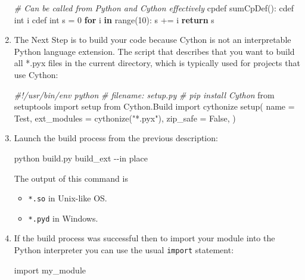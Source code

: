 \documentclass[
]{article}
\newenvironment{Shaded}{}{}
\newcommand{\AttributeTok}[1]{\textcolor[rgb]{0.49,0.56,0.16}{#1}}
\newcommand{\BuiltInTok}[1]{#1}
\newcommand{\CommentTok}[1]{\textcolor[rgb]{0.38,0.63,0.69}{\textit{#1}}}
\newcommand{\ControlFlowTok}[1]{\textcolor[rgb]{0.00,0.44,0.13}{\textbf{#1}}}
\newcommand{\DecValTok}[1]{\textcolor[rgb]{0.25,0.63,0.44}{#1}}
\newcommand{\ExtensionTok}[1]{#1}
\newcommand{\ImportTok}[1]{#1}
\newcommand{\KeywordTok}[1]{\textcolor[rgb]{0.00,0.44,0.13}{\textbf{#1}}}
\newcommand{\NormalTok}[1]{#1}
\newcommand{\OperatorTok}[1]{\textcolor[rgb]{0.40,0.40,0.40}{#1}}
\newcommand{\StringTok}[1]{\textcolor[rgb]{0.25,0.44,0.63}{#1}}
\newcommand{\VariableTok}[1]{\textcolor[rgb]{0.10,0.09,0.49}{#1}}
\begin{document}
\begin{enumerate}
\begin{Shaded}
\begin{Highlighting}[]
\CommentTok{\# Can be called from Python and Cython effectively}
\NormalTok{cpdef sumCpDef(): }
\NormalTok{  cdef }\BuiltInTok{int}\NormalTok{ i}
\NormalTok{  cdef }\BuiltInTok{int}\NormalTok{ s }\OperatorTok{=} \DecValTok{0}
  \ControlFlowTok{for}\NormalTok{ i }\KeywordTok{in} \BuiltInTok{range}\NormalTok{(}\DecValTok{10}\NormalTok{):}
\NormalTok{    s }\OperatorTok{+=}\NormalTok{ i}
  \ControlFlowTok{return}\NormalTok{ s}
\end{Highlighting}
\end{Shaded}
\item
  The Next Step is to build your code because Cython is not an
  interpretable Python language extension. The script that describes
  that you want to build all *.pyx files in the current directory, which
  is typically used for projects that use Cython:

\begin{Shaded}
\begin{Highlighting}[]
\CommentTok{\#!/usr/bin/env python}
\CommentTok{\# filename: setup.py}
\CommentTok{\# pip install Cython}
\ImportTok{from}\NormalTok{ setuptools }\ImportTok{import}\NormalTok{ setup}
\ImportTok{from}\NormalTok{ Cython.Build }\ImportTok{import}\NormalTok{ cythonize}
\NormalTok{setup(}
\NormalTok{    name        }\OperatorTok{=} \StringTok{\textquotesingle{}Test\textquotesingle{}}\NormalTok{,}
\NormalTok{    ext\_modules }\OperatorTok{=}\NormalTok{ cythonize(}\StringTok{"*.pyx"}\NormalTok{),}
\NormalTok{    zip\_safe    }\OperatorTok{=} \VariableTok{False}\NormalTok{,}
\NormalTok{)}
\end{Highlighting}
\end{Shaded}
\item
  Launch the build process from the previous description:

\begin{Shaded}
\begin{Highlighting}[]
\ExtensionTok{python}\NormalTok{ build.py build\_ext }\AttributeTok{{-}{-}in}\NormalTok{ place}
\end{Highlighting}
\end{Shaded}

  The output of this command is

  \begin{itemize}
  \item
    \texttt{*.so} in Unix-like OS.
  \item
    \texttt{*.pyd} in Windows.
  \end{itemize}
\item
  If the build process was successful then to import your module into
  the Python interpreter you can use the usual \texttt{import}
  statement:

\begin{Shaded}
\begin{Highlighting}[]
\ImportTok{import}\NormalTok{ my\_module}
\end{Highlighting}
\end{Shaded}
\end{enumerate}
\end{document}
